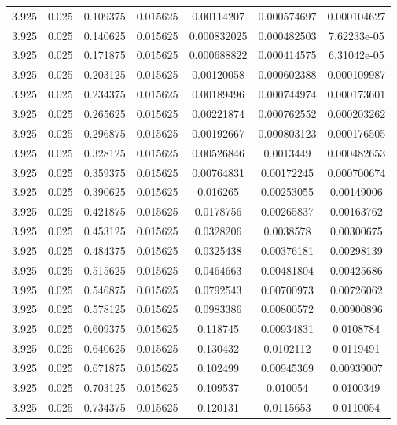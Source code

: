 \begin{table}[bh]
\begin{center}
{\begin{tabular}{ccccccc}
3.925	 & 0.025 & 	0.109375	 & 0.015625	 & 0.00114207	 & 0.000574697	 & 0.000104627 \\ 
3.925	 & 0.025 & 	0.140625	 & 0.015625	 & 0.000832025	 & 0.000482503	 & 7.62233e-05 \\ 
3.925	 & 0.025 & 	0.171875	 & 0.015625	 & 0.000688822	 & 0.000414575	 & 6.31042e-05 \\ 
3.925	 & 0.025 & 	0.203125	 & 0.015625	 & 0.00120058	 & 0.000602388	 & 0.000109987 \\ 
3.925	 & 0.025 & 	0.234375	 & 0.015625	 & 0.00189496	 & 0.000744974	 & 0.000173601 \\ 
3.925	 & 0.025 & 	0.265625	 & 0.015625	 & 0.00221874	 & 0.000762552	 & 0.000203262 \\ 
3.925	 & 0.025 & 	0.296875	 & 0.015625	 & 0.00192667	 & 0.000803123	 & 0.000176505 \\ 
3.925	 & 0.025 & 	0.328125	 & 0.015625	 & 0.00526846	 & 0.0013449	 & 0.000482653 \\ 
3.925	 & 0.025 & 	0.359375	 & 0.015625	 & 0.00764831	 & 0.00172245	 & 0.000700674 \\ 
3.925	 & 0.025 & 	0.390625	 & 0.015625	 & 0.016265	 & 0.00253055	 & 0.00149006 \\ 
3.925	 & 0.025 & 	0.421875	 & 0.015625	 & 0.0178756	 & 0.00265837	 & 0.00163762 \\ 
3.925	 & 0.025 & 	0.453125	 & 0.015625	 & 0.0328206	 & 0.0038578	 & 0.00300675 \\ 
3.925	 & 0.025 & 	0.484375	 & 0.015625	 & 0.0325438	 & 0.00376181	 & 0.00298139 \\ 
3.925	 & 0.025 & 	0.515625	 & 0.015625	 & 0.0464663	 & 0.00481804	 & 0.00425686 \\ 
3.925	 & 0.025 & 	0.546875	 & 0.015625	 & 0.0792543	 & 0.00700973	 & 0.00726062 \\ 
3.925	 & 0.025 & 	0.578125	 & 0.015625	 & 0.0983386	 & 0.00800572	 & 0.00900896 \\ 
3.925	 & 0.025 & 	0.609375	 & 0.015625	 & 0.118745	 & 0.00934831	 & 0.0108784 \\ 
3.925	 & 0.025 & 	0.640625	 & 0.015625	 & 0.130432	 & 0.0102112	 & 0.0119491 \\ 
3.925	 & 0.025 & 	0.671875	 & 0.015625	 & 0.102499	 & 0.00945369	 & 0.00939007 \\ 
3.925	 & 0.025 & 	0.703125	 & 0.015625	 & 0.109537	 & 0.010054	 & 0.0100349 \\ 
3.925	 & 0.025 & 	0.734375	 & 0.015625	 & 0.120131	 & 0.0115653	 & 0.0110054 \\ 

\end{tabular}}
\end{center}
\end{table}
